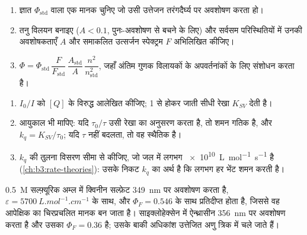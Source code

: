 \begin{method}[आपेक्षिक प्रतिदीप्ति क्वांटम लब्धि]\label{met:b3:electronic-spectroscopy:relative-yield}
\begin{enumerate}
  \item ज्ञात $\Phi_{\mathrm{std}}$ वाला एक मानक चुनिए जो उसी
        उत्तेजन तरंगदैर्घ्य पर अवशोषण करता हो।
  \item तनु विलयन बनाइए ($A < 0.1$, पुनः-अवशोषण से बचने के लिए) और
        सर्वसम परिस्थितियों में उनकी अवशोषकताएँ $A$ और समाकलित उत्सर्जन स्पेक्ट्रम $F$
        अभिलिखित कीजिए।
  \item $\Phi = \Phi_{\mathrm{std}}\,\dfrac{F}{F_{\mathrm{std}}}\,\dfrac{A_{\mathrm{std}}}{A}\,
        \dfrac{n^2}{n_{\mathrm{std}}^2}$, जहाँ अंतिम गुणक विलायकों के अपवर्तनांकों के
        लिए संशोधन करता है।
\end{enumerate}
\end{method}

\begin{method}[शमन आँकड़ों का विश्लेषण]\label{met:b3:electronic-spectroscopy:stern-volmer}
\begin{enumerate}
  \item $I_0/I$ को $[Q]$ के विरुद्ध आलेखित कीजिए; 1 से होकर जाती सीधी रेखा $K_{SV}$ देती है।
  \item आयुकाल भी मापिए: यदि $\tau_0/\tau$ उसी रेखा का अनुसरण करता है, तो शमन
        गतिक है, और $k_q = K_{SV}/\tau_0$; यदि $\tau$ नहीं बदलता, तो वह स्थैतिक है।
  \item $k_q$ की तुलना विसरण सीमा से कीजिए, जो जल में लगभग \qty{e10}{L.mol^{-1}.s^{-1}} है
        (\cref{ch:b3:rate-theories}): उसके निकट $k_q$ का अर्थ है कि लगभग हर
        भेंट शमन करती है।
\end{enumerate}
\end{method}

\begin{example}[क्विनीन और ऐन्थ्रासीन]\label{ex:b3:electronic-spectroscopy:quinine}
\qty{0.5}{M} सल्फ़्यूरिक अम्ल में क्विनीन सल्फ़ेट \qty{349}{nm} पर अवशोषण करता है, $\varepsilon =
\qty{5700}{L.mol^{-1}.cm^{-1}}$ के साथ, और $\Phi_F = 0.546$ के साथ प्रतिदीप्त होता है, जिससे वह
आपेक्षिक  का चिरप्रचलित मानक बन जाता है। साइक्लोहेक्सेन में ऐन्थ्रासीन
\qty{356}{nm} पर अवशोषण करता है और उसका $\Phi_F = 0.36$ है; उसके बाकी अधिकांश उत्तेजित
अणु त्रिक में चले जाते हैं।
\end{example}

